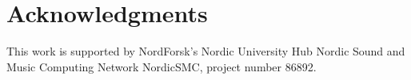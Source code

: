 \documentclass[twoside,a4paper, dvipsnames]{article}
\title{\papertitle}
\newif\ifpdf
\begin{document}
\ifpdf %
  \DeclareGraphicsExtensions{.png,.jpg,.pdf, .eps}
\else  %
\fi


\maketitle

\begin{abstract}

\end{abstract}
% 



% 





\section{Acknowledgments}
This work is supported by NordForsk's Nordic
University Hub Nordic Sound and Music Computing Network
NordicSMC, project number 86892.

\nocite{*}
{\small

}
\end{document}
